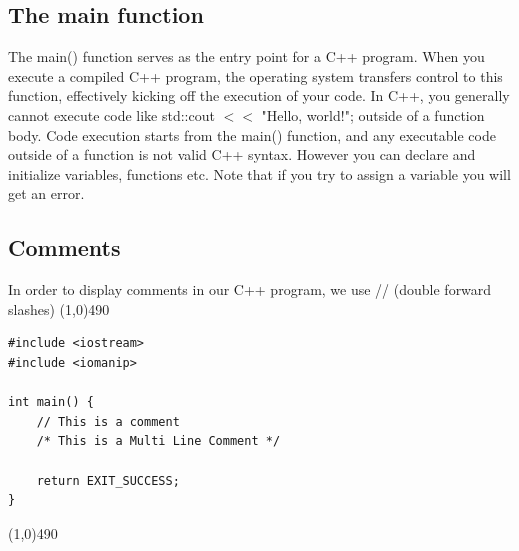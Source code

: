 \documentclass{report}
\begin{document}
    \bigbreak \noindent 
    \subsection{The main function}
    \bigbreak \noindent 
    The main() function serves as the entry point for a C++ program. When you execute a compiled C++ program, the operating system transfers control to this function, effectively kicking off the execution of your code.
    \bigbreak \noindent 
    In C++, you generally cannot execute code like std::cout $<<$ "Hello, world!"; outside of a function body. Code execution starts from the main() function, and any executable code outside of a function is not valid C++ syntax. However you can declare and initialize variables, functions etc. Note that if you try to assign a variable you will get an error. 

    \bigbreak \noindent 
    \subsection{Comments}
    In order to display comments in our C++ program, we use // (double forward slashes)
    \bigbreak \noindent 
    \line(1,0){490}
    \begin{verbatim}
#include <iostream> 
#include <iomanip>

int main() {
    // This is a comment
    /* This is a Multi Line Comment */

    return EXIT_SUCCESS;
}
    \end{verbatim}
    \line(1,0){490}

    \pagebreak \bigbreak \noindent 
\end{document}
